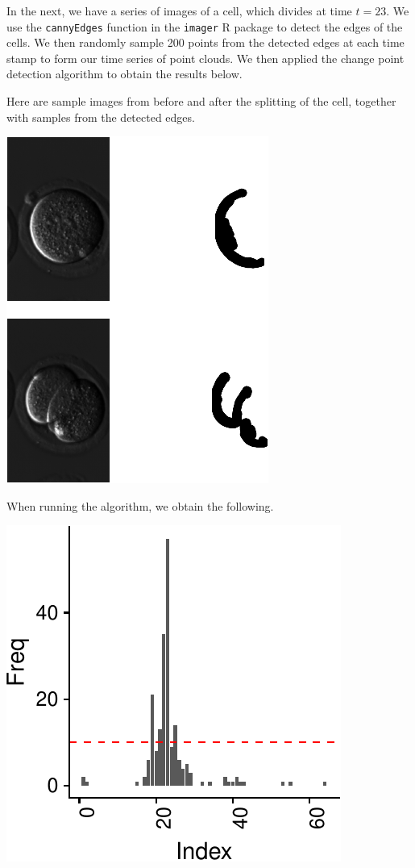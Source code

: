 \documentclass[smallextended]{svjour3}       %
\begin{document}
In the next, we have a series of images of a cell, which divides at time
\(t = 23\). We use the \texttt{cannyEdges} function in the
\texttt{imager} R package to detect the edges of the cells. We then
randomly sample 200 points from the detected edges at each time stamp to
form our time series of point clouds. We then applied the change point
detection algorithm to obtain the results below.

Here are sample images from before and after the splitting of the cell,
together with samples from the detected edges.

\begin{center}\includegraphics{springer_template_files/figure-latex/chunk_10_5-1} \end{center}

When running the algorithm, we obtain the following.

\begin{center}\includegraphics{springer_template_files/figure-latex/chunk_11-1} \end{center}
\end{document}
